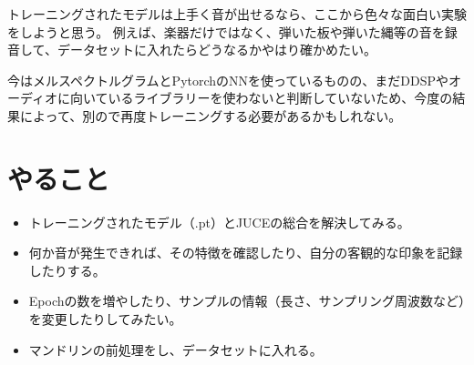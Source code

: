 \documentclass[a4paper, 12pt]{article}
\begin{document}
トレーニングされたモデルは上手く音が出せるなら、ここから色々な面白い実験をしようと思う。
例えば、楽器だけではなく、弾いた板や弾いた縄等の音を録音して、データセットに入れたらどうなるかやはり確かめたい。

今はメルスペクトルグラムとPytorchのNNを使っているものの、まだDDSPやオーディオに向いているライブラリーを使わないと判断していないため、今度の結果によって、別ので再度トレーニングする必要があるかもしれない。

\section*{やること}
\begin{itemize}
    \item トレーニングされたモデル（.pt）とJUCEの総合を解決してみる。
    \item 何か音が発生できれば、その特徴を確認したり、自分の客観的な印象を記録したりする。
    \item Epochの数を増やしたり、サンプルの情報（長さ、サンプリング周波数など）を変更したりしてみたい。
    \item マンドリンの前処理をし、データセットに入れる。
\end{itemize}

\section{}



\end{document}
